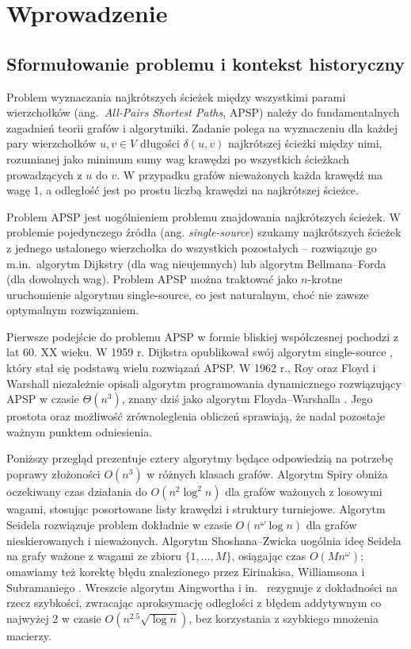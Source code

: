 \chapter{Wprowadzenie}
 
\section{Sformułowanie problemu i kontekst historyczny}
 
Problem wyznaczania najkrótszych ścieżek między wszystkimi parami wierzchołków (ang.\ \emph{All-Pairs Shortest Paths}, APSP) należy do fundamentalnych zagadnień teorii grafów i algorytmiki. Zadanie polega na wyznaczeniu dla każdej pary wierzchołków $u, v \in V$ długości $\delta(u, v)$ najkrótszej ścieżki między nimi, rozumianej jako minimum sumy wag krawędzi po wszystkich ścieżkach prowadzących z $u$ do $v$. W przypadku grafów nieważonych każda krawędź ma wagę 1, a odległość jest po prostu liczbą krawędzi na najkrótszej ścieżce.
 
Problem APSP jest uogólnieniem problemu znajdowania najkrótszych ścieżek. W problemie pojedynczego źródła (ang. \emph{single-source}) szukamy najkrótszych ścieżek z jednego ustalonego wierzchołka do wszystkich pozostałych -- rozwiązuje go m.in.\ algorytm Dijkstry (dla wag nieujemnych) lub algorytm Bellmana--Forda (dla dowolnych wag). Problem APSP można traktować jako $n$-krotne uruchomienie algorytmu single-source, co jest naturalnym, choć nie zawsze optymalnym rozwiązaniem.
 
Pierwsze podejście do problemu APSP w formie bliskiej współczesnej pochodzi z lat 60. XX wieku. W 1959 r. Dijkstra opublikował swój algorytm single-source \cite{Dijkstra1959}, który stał się podstawą wielu rozwiązań APSP. W 1962 r., Roy oraz Floyd i Warshall niezależnie opisali algorytm programowania dynamicznego rozwiązujący APSP w czasie $\Theta(n^3)$, znany dziś jako algorytm Floyda--Warshalla \cite{Floyd1962}. Jego prostota oraz możliwość zrównoleglenia obliczeń sprawiają, że nadal pozostaje ważnym punktem odniesienia.

Poniższy przegląd prezentuje cztery algorytmy będące odpowiedzią na potrzebę poprawy złożoności $O(n^3)$ w różnych klasach grafów. Algorytm Spiry \cite{Spira1973} obniża oczekiwany czas działania do $O(n^2 \log^2 n)$ dla grafów ważonych z losowymi wagami, stosując posortowane listy krawędzi i struktury turniejowe. Algorytm Seidela \cite{Seidel1995} rozwiązuje problem dokładnie w czasie $O(n^\omega \log n)$ dla grafów nieskierowanych i nieważonych. Algorytm Shoshana--Zwicka \cite{ShoshanZwick1999} uogólnia ideę Seidela na grafy ważone z wagami ze zbioru $\{1,\ldots,M\}$, osiągając czas $O(Mn^\omega)$; omawiamy też korektę błędu znalezionego przez Eirinakisa, Williamsona i Subramaniego \cite{Eirinakis2017}. Wreszcie algorytm Aingwortha i in.\ \cite{Aingworth1999} rezygnuje z dokładności na rzecz szybkości, zwracając aproksymację odległości z błędem addytywnym co najwyżej 2 w czasie $O(n^{2.5}\sqrt{\log n})$, bez korzystania z szybkiego mnożenia macierzy.

